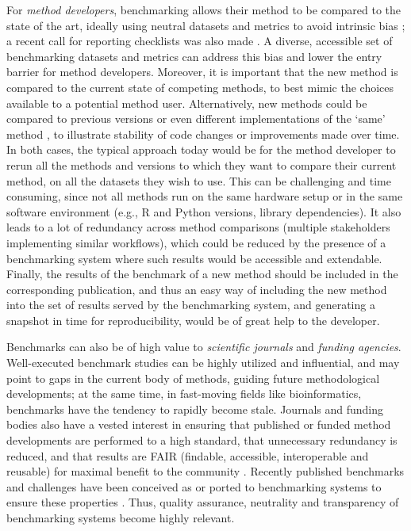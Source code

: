 \documentclass[11pt]{article}
\begin{document}
For \emph{method developers}, benchmarking allows their method to be compared to the state of the art, ideally using neutral datasets and metrics to avoid intrinsic bias \cite{Boulesteix2013-vy, Weber2019-el}; a recent call for reporting checklists was also made \cite{Brooks2024-rq}. A diverse, accessible set of benchmarking datasets and metrics can address this bias and lower the entry barrier for method developers. Moreover, it is important that the new method is compared to the current state of competing methods, to best mimic the choices available to a potential method user. Alternatively, new methods could be compared to previous versions or even different implementations of the `same' method \cite{Rich2024-jh}, to illustrate stability of code changes or improvements made over time. In both cases, the typical approach today would be for the method developer to rerun all the methods and versions to which they want to compare their current method, on all the datasets they wish to use. This can be challenging and time consuming, since not all methods run on the same hardware setup or in the same software environment (e.g., R and Python versions, library dependencies). It also leads to a lot of redundancy across method comparisons (multiple stakeholders implementing similar workflows), which could be reduced by the presence of a benchmarking system where such results would be accessible and extendable. Finally, the results of the benchmark of a new method should be included in the corresponding publication, and thus an easy way of including the new method into the set of results served by the benchmarking system, and generating a snapshot in time for reproducibility, would be of great help to the developer. 

Benchmarks can also be of high value to \emph{scientific journals} and \emph{funding agencies}. Well-executed benchmark studies can be highly utilized and influential, and may point to gaps in the current body of methods, guiding future methodological developments; at the same time, in fast-moving fields like bioinformatics, benchmarks have the tendency to rapidly become stale. Journals and funding bodies also have a vested interest in ensuring that published or funded method developments are performed to a high standard, that unnecessary redundancy is reduced, and that results are FAIR (findable, accessible, interoperable and reusable) for maximal benefit to the community \cite{Wilkinson2016-bh}. {\color{red} Recently published benchmarks and challenges have been conceived as or ported to benchmarking systems to ensure these properties \cite{Nevers_2022,Bryce_Smith_2023, Pardo_Palacios_2023}.} Thus, quality assurance, neutrality and transparency of benchmarking systems become highly relevant. 
\end{document}
